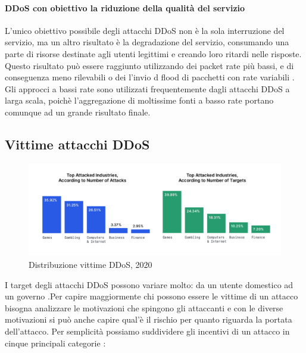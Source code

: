 \paragraph{DDoS con obiettivo la riduzione della qualità del servizio}


L'unico obiettivo possibile degli attacchi DDoS non è la sola interruzione del servizio, ma un altro risultato è la degradazione del servizio, consumando una parte di risorse destinate agli utenti legittimi e creando loro ritardi nelle risposte. Questo risultato può essere raggiunto utilizzando dei packet rate più bassi, e di conseguenza meno rilevabili o dei l'invio d flood di pacchetti con rate variabili \cite{ddos_survey_3, ddos_survey_4}.
Gli approcci a bassi rate sono utilizzati frequentemente dagli attacchi DDoS a larga scala, poichè l'aggregazione di moltissime fonti a basso rate portano comunque ad un grande risultato finale.

\subsection{Vittime attacchi DDoS}

\begin{figure}[h]
    \includegraphics[width=\hsize]{images/introduzione/bersagli_ddos.png}
    \caption{Distribuzione vittime DDoS, 2020 \cite{imperva_ddos_report}}
    \centering
\end{figure}

I target degli attacchi DDoS possono variare molto: da un utente domestico ad un governo \cite{ddos_motivations}.Per capire maggiormente chi possono essere le vittime di un attacco bisogna analizzare le motivazioni che spingono gli attaccanti e con le diverse motivazioni si può anche capire qual'è il rischio per quanto riguarda la portata dell'attacco. Per semplicità possiamo suddividere gli incentivi di un attacco in cinque principali categorie \cite{ddos_survey_1, ddos_motivations}:

